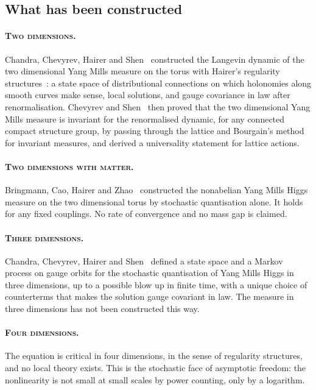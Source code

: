 \subsection{What has been constructed}

\paragraph{\normalfont\scshape Two dimensions.} Chandra, Chevyrev, Hairer and Shen~\cite{CCHS} constructed the Langevin dynamic of the two dimensional Yang Mills measure on the torus with Hairer's regularity structures~\cite{Ha14}: a state space of distributional connections on which holonomies along smooth curves make sense, local solutions, and gauge covariance in law after renormalisation. Chevyrev and Shen~\cite{ChSh23} then proved that the two dimensional Yang Mills measure is invariant for the renormalised dynamic, for any connected compact structure group, by passing through the lattice and Bourgain's method~\cite{Bo96} for invariant measures, and derived a universality statement for lattice actions.

\paragraph{\normalfont\scshape Two dimensions with matter.} Bringmann, Cao, Hairer and Zhao~\cite{BCHZ} constructed the nonabelian Yang Mills Higgs measure on the two dimensional torus by stochastic quantisation alone. It holds for any fixed couplings. No rate of convergence and no mass gap is claimed.

\paragraph{\normalfont\scshape Three dimensions.} Chandra, Chevyrev, Hairer and Shen~\cite{CCHS3} defined a state space and a Markov process on gauge orbits for the stochastic quantisation of Yang Mills Higgs in three dimensions, up to a possible blow up in finite time, with a unique choice of counterterms that makes the solution gauge covariant in law. The measure in three dimensions has not been constructed this way.

\paragraph{\normalfont\scshape Four dimensions.} The equation is critical in four dimensions, in the sense of regularity structures, and no local theory exists. This is the stochastic face of asymptotic freedom: the nonlinearity is not small at small scales by power counting, only by a logarithm.

